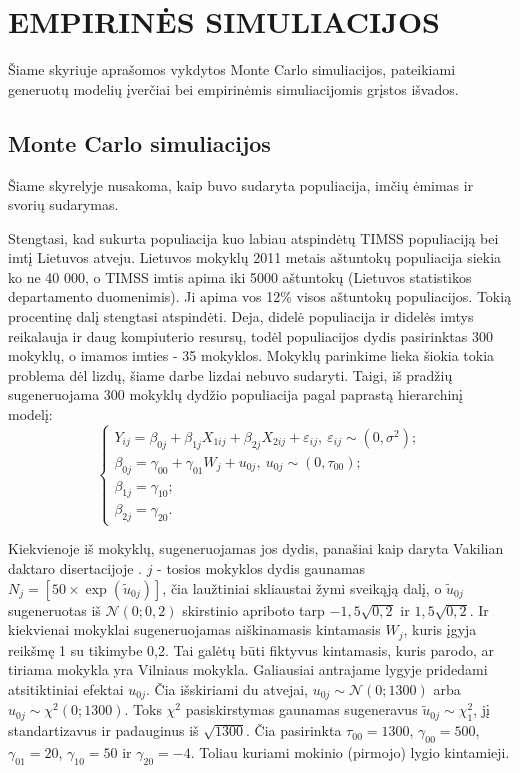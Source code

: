 \documentclass[12pt,a4paper]{article}
\begin{document}
\newpage
\section{EMPIRINĖS SIMULIACIJOS} \label{sec:simul}
\indent Šiame skyriuje aprašomos vykdytos Monte Carlo simuliacijos, pateikiami generuotų modelių įverčiai bei empirinėmis simuliacijomis grįstos išvados.


\subsection{Monte Carlo simuliacijos}
\indent Šiame skyrelyje nusakoma, kaip buvo sudaryta populiacija, imčių ėmimas ir svorių sudarymas.

\indent Stengtasi, kad sukurta populiacija kuo labiau atspindėtų TIMSS populiaciją bei imtį Lietuvos atveju. Lietuvos mokyklų 2011 metais aštuntokų populiacija siekia ko ne 40 000, o TIMSS imtis apima iki 5000 aštuntokų (Lietuvos statistikos departamento duomenimis). Ji apima vos 12\% visos aštuntokų populiacijos. Tokią procentinę dalį stengtasi atspindėti. Deja, didelė populiacija ir didelės imtys reikalauja ir daug kompiuterio resursų, todėl populiacijos dydis pasirinktas 300 mokyklų, o imamos imties - 35 mokyklos. Mokyklų parinkime lieka šiokia tokia problema dėl lizdų, šiame darbe lizdai nebuvo sudaryti. Taigi, iš pradžių sugeneruojama 300 mokyklų dydžio populiacija pagal paprastą hierarchinį modelį:
\begin{equation}\label{eq:simul}
\left\{
\begin{array}{l}
Y_{ij}=\beta_{0j}+\beta_{1j}X_{1ij}+\beta_{2j}X_{2ij}+\varepsilon_{ij}, \ \varepsilon_{ij}\sim (0, \sigma^2);\\
\beta_{0j}=\gamma_{00}+\gamma_{01}W_j+u_{0j}, \ u_{0j}\sim (0, \tau_{00});\\
\beta_{1j}=\gamma_{10};\\
\beta_{2j}=\gamma_{20}.
\end{array} \right.
\end{equation}

\indent Kiekvienoje iš mokyklų, sugeneruojamas jos dydis, panašiai kaip daryta Vakilian daktaro disertacijoje \cite{mcmc}. $j$ - tosios mokyklos dydis gaunamas $N_j=\left[50\times\exp{(\tilde{u}_{0j})}\right]$, čia laužtiniai skliaustai žymi sveikąją dalį, o $\tilde{u}_{0j}$ sugeneruotas iš $\mathcal{N}(0; 0,2)$ skirstinio apriboto tarp $-1,5\sqrt{0,2}$ ir $1,5\sqrt{0,2}$. Ir kiekvienai mokyklai sugeneruojamas aiškinamasis kintamasis $W_j$, kuris įgyja reikšmę 1 su tikimybe 0,2. Tai galėtų būti fiktyvus kintamasis, kuris parodo, ar tiriama mokykla yra Vilniaus mokykla. Galiausiai antrajame lygyje pridedami atsitiktiniai efektai $u_{0j}$. Čia išskiriami du atvejai, $u_{0j}\sim \mathcal{N}(0; 1300)$ arba $u_{0j}\sim \chi^2(0; 1300)$. Toks $\chi^2$ pasiskirstymas gaunamas sugeneravus $\tilde{u}_{0j}\sim\chi^2_1$, jį standartizavus ir padauginus iš $\sqrt{1300}$. Čia pasirinkta $\tau_{00}=1300$, $\gamma_{00}=500$, $\gamma_{01}=20$, $\gamma_{10}=50$ ir $\gamma_{20}=-4$. Toliau kuriami mokinio (pirmojo) lygio kintamieji.
\end{document}
